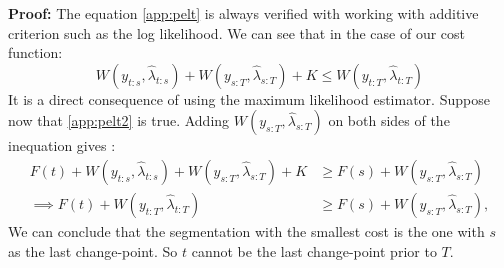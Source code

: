 \begin{appendices}
\textbf{Proof:} The equation \ref{app:pelt} is always verified with working with additive criterion such as the log likelihood. We can see that in the case of our cost function: 
$$W(y_{t:s},\hat\lambda_{t:s})+W(y_{s:T},\hat\lambda_{s:T})+K\leq W(y_{t:T},\hat\lambda_{t:T})$$
It is a direct consequence of using the maximum likelihood estimator. Suppose now that \ref{app:pelt2} is true. Adding $W(y_{s:T},\hat\lambda_{s:T})$ on both sides of the inequation gives : 
\begin{align*}
  F(t)+W(y_{t:s},\hat\lambda_{t:s})+W(y_{s:T},\hat\lambda_{s:T})+K &\geq F(s)+W(y_{s:T},\hat\lambda_{s:T}) \\
  \implies F(t)+W(y_{t:T},\hat\lambda_{t:T}) &\geq F(s)+W(y_{s:T},\hat\lambda_{s:T}),
\end{align*}
We can conclude that the segmentation with the smallest cost is the one with $s$ as the last change-point. So $t$ cannot be the last change-point prior to $T$.







\end{appendices}
